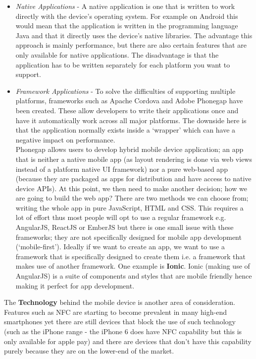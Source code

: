 \begin{itemize}
\item \emph{Native Applications} - A native application is one that is written to work directly with the device's operating system. For example on Android this would mean that the application is written in the programming language Java and that it directly uses the device's native libraries. The advantage this approach is mainly performance, but there are also certain features that are only available for native applications. The disadvantage is that the application has to be written separately for each platform you want to support.
\item \emph{Framework Applications} - To solve the difficulties of supporting multiple platforms, frameworks such as Apache Cordova and Adobe Phonegap have been created. These allow developers to write their applications once and have it automatically work across all major platforms. The downside here is that the application normally exists inside a `wrapper' which can have a negative impact on performance.  \\
Phonegap allows users to develop hybrid mobile device application; an app that is neither a native mobile app (as layout rendering is done via web views instead of a platform native UI framework) nor a pure web-based app (because they are packaged as apps for distribution and have access to native device APIs).  At this point, we then need to make another decision; how we are going to build the web app?  There are two methods we can choose from; writing the whole app in pure JavaScript, HTML and CSS.  This requires a lot of effort thus most people will opt to use a regular framework e.g. AngularJS, ReactJS or EmberJS but there is one small issue with these frameworks; they are not specifically designed for mobile app development (`mobile-first').  Ideally if we want to create an app, we want to use a framework that is specifically designed to create them i.e. a framework that makes use of another framework.  One example is \textbf{Ionic}.  Ionic (making use of AngularJS) is a suite of components and styles that are mobile friendly hence making it perfect for app development.
\end{itemize}
The \textbf{Technology} behind the mobile device is another area of consideration.  Features such as NFC are starting to become prevalent in many high-end smartphones yet there are still devices that block the use of such technology (such as the iPhone range - the iPhone 6 does have NFC capability but this is only available for apple pay) and there are devices that don't have this capability purely because they are on the lower-end of the market. 

